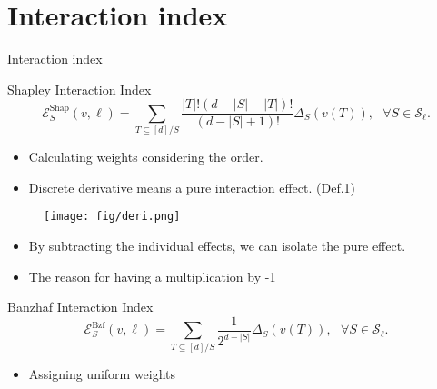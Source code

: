 \documentclass[10pt]{beamer}
\newcommand{\f}{v}
\newcommand{\ex}{\Expl}
\def\Expl{\mathcal{E}}
\newcommand{\setlessell}{\mathcal{S}_\ell }
\begin{document}
\section[Interaction index]{Interaction index}
\begin{frame}{Interaction index}
    \begin{mydefbox}{Shapley Interaction Index}
        \begin{equation*}
            \label{eqn:closed_form_shap_inter}
            \ex_S^{\text{Shap}}(\f, \ell) =  \sum_{T \subseteq [d]/ S}  \frac{|T|! (d-|S|-|T|)!}{(d-|S|+1)!} \Delta_S(\f(T)),\ \ \  
            \forall S \in \setlessell.
            \tag{5}
        \end{equation*}
    \end{mydefbox}
    \vspace{1.5em}
    \begin{itemize}[label=\scalebox{0.5}{$\blacksquare$}]
        \item Calculating weights considering the order.
        \item Discrete derivative means a pure interaction effect. (Def.1)
    \end{itemize}
\end{frame}
\begin{frame}
    \begin{figure}[h]
    \centering
    \texttt{[image: fig/deri.png]}
    \end{figure}
    \vspace{1.5em}
    \begin{itemize}
        \item By subtracting the individual effects, we can isolate the pure effect.
        \item The reason for having a multiplication by -1
        
    \end{itemize}
\end{frame}
\begin{frame}
    \begin{mydefbox}{Banzhaf Interaction Index}
        \begin{equation*}
            \label{eqn:closed_form_bzf_inter}
            \ex^{\text{Bzf}}_S(\f,\ell) =  \sum_{T \subseteq [d]/S}  \frac{1}{2^{d-|S|}} \Delta_S(\f(T)),\ \ \  
            \forall  S \in \setlessell.
            \tag{6}
        \end{equation*}
    \end{mydefbox}
    \vspace{1.5em}
    \begin{itemize}[label=\scalebox{0.5}{$\blacksquare$}]
        \item Assigning uniform weights
    \end{itemize}
\end{frame}
\end{document}
